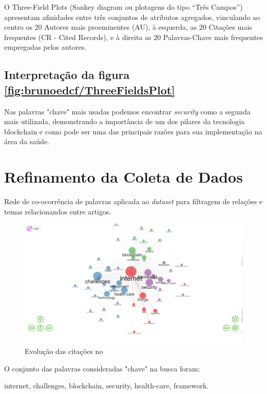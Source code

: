 O Three-Field Plots (Sankey diagram ou plotagens do tipo “Três Campos”) apresentam afinidades entre três conjuntos de atributos agregados,
vinculando ao centro os 20 Autores mais proeminentes (AU), à esquerda, as 20 Citações mais frequentes (CR - Cited Records), e à direita
as 20 Palavras-Chave mais frequentes empregadas pelos autores.

\subsection{Interpretação da figura \ref{fig:brunoedcf/ThreeFieldsPlot}}

Nas palavras "chave" mais usadas podemos encontrar \textit{security} como a segunda mais utilizada, demonstrando a importância de um dos pilares
da tecnologia blockchain e como pode ser uma das principais razões para sua implementação na área da saúde. 

\section{Refinamento da Coleta de Dados}

Rede de co-ocorrência de palavras aplicada ao \textit{dataset} para filtragem de relações e temas relacionandos entre artigos.

\begin{figure}[H]
    \centering
    \includegraphics[width=1\textwidth]{experiments/brunoedcf/AnaliseBibliometrica/BlockchainInHealth/Figures/WordOccurrNet.png}
    \caption{Evolução das citações no \dataset}
    \label{fig:brunoedcf/WordOccurrNet}
\end{figure}

O conjunto das palavras consideradas "chave" na busca foram: 

internet, challenges, blockchain, security, health-care, framework.

